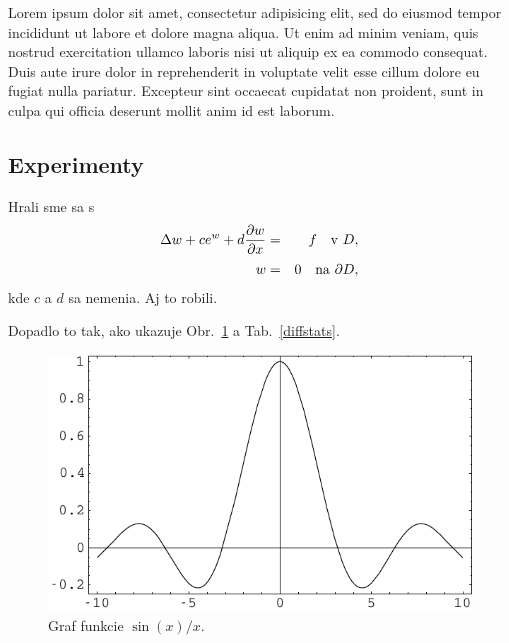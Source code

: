 \documentclass{svk_long_sk}
\begin{document}
Lorem ipsum dolor sit amet, consectetur adipisicing elit, sed do eiusmod tempor incididunt ut labore et dolore magna aliqua. Ut enim ad minim veniam, quis nostrud exercitation ullamco laboris nisi ut aliquip ex ea commodo consequat. Duis aute irure dolor in reprehenderit in voluptate velit esse cillum dolore eu fugiat nulla pariatur. Excepteur sint occaecat cupidatat non proident, sunt in culpa qui officia deserunt mollit anim id est laborum.

\subsection{Experimenty}
Hrali sme sa s
\begin{eqnarray} 
{\displaystyle \Delta w + c e^w + d{ {\partial w}\over{\partial x} } } 
&=&{\displaystyle f \quad {\rm v}\ D, }\nonumber\\[-1.5ex]
\label{bratu} \\[-1.5ex]
{\displaystyle w }&=&{\displaystyle 0 \quad {\rm na}\ \partial D , } \nonumber
\end{eqnarray} 
kde $c$ a $d$ sa nemenia. Aj \cite{Brown-Saad1} to robili.

Dopadlo to tak, ako ukazuje Obr.~\ref{diff} a Tab.~\ref{diffstats}.

\begin{figure}
\includegraphics[width=\columnwidth]{fig}
\caption{Graf funkcie $\sin(x)/x$.} 
\label{diff} 
\end{figure}  
 
\end{document}

